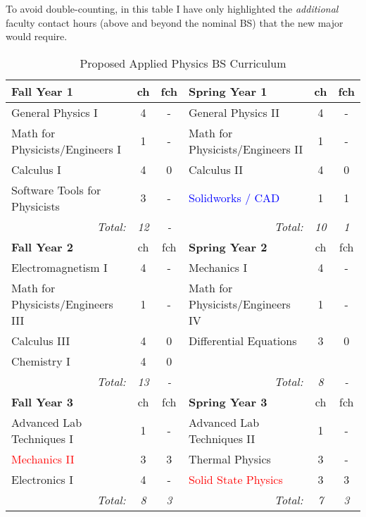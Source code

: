 \documentclass[12pt,preprint]{aastex}
\newcommand{\red}[1]{\textcolor{red}{#1}}
\newcommand{\blue}[1]{\textcolor{blue}{#1}}
\begin{document}
To avoid double-counting, in this table I have only highlighted the
\emph{additional} faculty contact hours (above and beyond the nominal BS) that
the new major would require.

\begin{longtable}{lcclcc}
\caption{Proposed Applied Physics BS Curriculum}\label{table:applied} \\
\hline
{\bf Fall Year 1} & {\sc ch} & {\sc fch} & {\bf Spring Year 1} & {\sc ch} & {\sc fch}  \\ 
\hline
\hline
General Physics I                        & 4 & - & General Physics II & 4 & - \\
Math for Physicists/Engineers I          & 1 & - & Math for Physicists/Engineers II & 1 & -  \\ 
Calculus I                               & 4 & 0 & Calculus II & 4 & 0 \\
Software Tools for Physicists            & 3 & - & \blue{Solidworks / CAD} & 1 & 1 \\ 
\multicolumn{1}{r}{\emph{Total:}} & \emph{12} & \emph{-} &
\multicolumn{1}{r}{\emph{Total:}} & \emph{10}  & \emph{1} \\

\hline
{\bf Fall Year 2} & {\sc ch} & {\sc fch} & {\bf Spring Year 2} & {\sc ch} & {\sc fch} \\ 
\hline
\hline
Electromagnetism I                & 4 & - & Mechanics I                      & 4 & - \\
Math for Physicists/Engineers III & 1 & - & Math for Physicists/Engineers IV & 1 & - \\ 
Calculus III                      & 4 & 0 & Differential Equations           & 3 & 0 \\
Chemistry I                       & 4 & 0 &                                  &   &  \\
\multicolumn{1}{r}{\emph{Total:}} & \emph{13} & \emph{-} &
\multicolumn{1}{r}{\emph{Total:}} & \emph{8} & \emph{-} \\

\hline
{\bf Fall Year 3} & {\sc ch} & {\sc fch} & {\bf Spring Year 3} & {\sc ch} & {\sc fch}  \\ 
\hline
\hline
Advanced Lab Techniques I  & 1 & - & Advanced Lab Techniques II & 1 & - \\
\red{Mechanics II}         & 3 & 3 & Thermal Physics            & 3 & - \\
Electronics I              & 4 & - & \red{Solid State Physics} & 3 & 3 \\ 
\multicolumn{1}{r}{\emph{Total:}} & \emph{8} & \emph{3} &
\multicolumn{1}{r}{\emph{Total:}} & \emph{7} & \emph{3} \\


\end{longtable}
\end{document}

